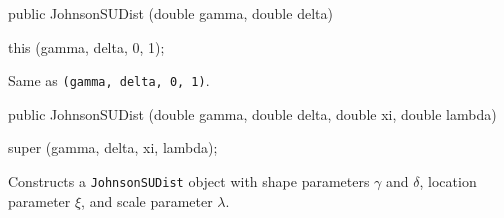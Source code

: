 \begin{code}

   public JohnsonSUDist (double gamma, double delta)\begin{hide} {
      this (gamma, delta, 0, 1);
   }\end{hide}
\end{code}
  \begin{tabb}
    Same as 
    {\texttt{(gamma, delta, 0, 1)}}.
  \end{tabb}
\begin{code}

   public JohnsonSUDist (double gamma, double delta,
                         double xi, double lambda)\begin{hide} {
      super (gamma, delta, xi, lambda);
   }\end{hide}
\end{code}
  \begin{tabb} Constructs a \texttt{JohnsonSUDist} object
   with shape parameters $\gamma$ and $\delta$,
   location parameter $\xi$, and scale parameter $\lambda$.
  \end{tabb}

